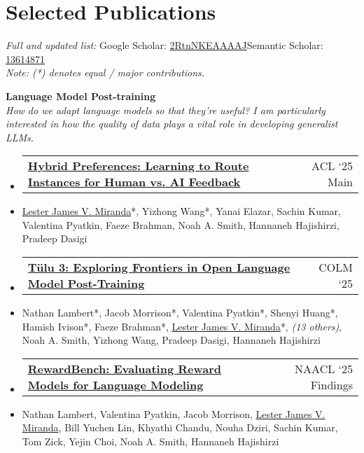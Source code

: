 \documentclass[a4paper,11pt]{article}
\makeatletter
\newcommand{\resumeItem}[1]{
  \item\small{
    {#1 \vspace{-2pt}}
  }
}
\newcommand{\resumeProjectHeading}[2]{
    \item
    \begin{tabular*}{0.97\textwidth}{l@{\extracolsep{\fill}}r}
      \small#1 & #2 \\
    \end{tabular*}\vspace{-7pt}
}
\newcommand{\resumeSubHeadingListStart}{\begin{itemize}[leftmargin=0.15in, label={}]}
\newcommand{\resumeSubHeadingListEnd}{\end{itemize}}
\makeatother
\begin{document}
\newpage

\section{Selected Publications}
\textit{Full and updated list:} Google Scholar: \href{https://scholar.google.com/citations?user=2RtnNKEAAAAJ&hl=en}{2RtnNKEAAAAJ}\quad Semantic Scholar: \href{https://www.semanticscholar.org/author/Lester-James-Validad-Miranda/13614871}{13614871}\\
\textit{Note: (*) denotes equal / major contributions.}

\vspace{1em}
\textbf{Language Model Post-training}\\
\textit{\small How do we adapt language models so that they're useful? I am particularly interested in how the quality of data plays a vital role in developing generalist LLMs.}
\resumeSubHeadingListStart
\resumeProjectHeading
{\href{https://aclanthology.org/2025.acl-long.355/}{\textbf{Hybrid Preferences: Learning to Route Instances for Human vs. AI Feedback}}}{\small ACL `25 Main}
\resumeItem{\underline{Lester James V. Miranda}*, Yizhong Wang*, Yanai Elazar, Sachin Kumar, Valentina Pyatkin, Faeze Brahman, Noah A. Smith, Hannaneh Hajishirzi, Pradeep Dasigi}
\resumeProjectHeading
{\href{https://arxiv.org/abs/2411.15124}{\textbf{T\"ulu 3: Exploring Frontiers in Open Language Model Post-Training}}}{\small COLM `25}
\resumeItem{Nathan Lambert*, Jacob Morrison*, Valentina Pyatkin*, Shenyi Huang*, Hamish Ivison*, Faeze Brahman*, \underline{Lester James V. Miranda}*, \textit{(13 others)}, Noah A. Smith, Yizhong Wang, Pradeep Dasigi, Hannaneh Hajishirzi}
\resumeProjectHeading
{\href{https://aclanthology.org/2025.findings-naacl.96/}{\textbf{RewardBench: Evaluating Reward Models for Language Modeling}}}{\small NAACL `25 Findings}
\resumeItem{Nathan Lambert, Valentina Pyatkin, Jacob Morrison, \underline{Lester James V. Miranda}, Bill Yuchen Lin, Khyathi Chandu, Nouha Dziri, Sachin Kumar, Tom Zick, Yejin Choi, Noah A. Smith, Hannaneh Hajishirzi}
\resumeSubHeadingListEnd
\end{document}
